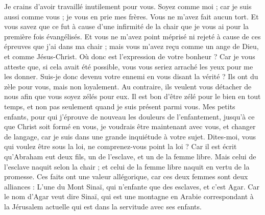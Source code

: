 \begin{multicols}{2}
Je crains d’avoir travaillé inutilement pour vous.
Soyez comme moi ; car je suis aussi comme vous ; je vous en prie mes frères.
Vous ne m'avez fait aucun tort. Et vous savez que ce fut à cause d’une infirmité de la chair que je vous ai pour la première fois évangélisés.
Et vous ne m’avez point méprisé ni rejeté à cause de ces épreuves que j’ai dans ma chair ; mais vous m'avez reçu comme un ange de Dieu, et comme Jésus-Christ.
Où donc est l’expression de votre bonheur ? Car je vous atteste que, si cela avait été possible, vous vous seriez arraché les yeux pour me les donner.
Suis-je donc devenu votre ennemi en vous disant la vérité ?
Ils ont du zèle pour vous, mais non loyalement. Au contraire, ils veulent vous détacher de nous afin que vous soyez zélés pour eux.
Il est bon d'être zélé pour le bien en tout temps, et non pas seulement quand je suis présent parmi vous.
Mes petits enfants, pour qui j’éprouve de nouveau les douleurs de l’enfantement, jusqu'à ce que Christ soit formé en vous,
je voudrais être maintenant avec vous, et changer de langage, car je suis dans une grande inquiétude à votre sujet.
Dites-moi, vous qui voulez être sous la loi, ne comprenez-vous point la loi ?
Car il est écrit qu'Abraham eut deux fils, un de l’esclave, et un de la femme libre.
Mais celui de l’esclave naquit selon la chair ; et celui de la femme libre naquit en vertu de la promesse.
Ces faits ont une valeur allégorique, car ces deux femmes sont deux alliances : L'une du Mont Sinaï, qui n’enfante que des esclaves, et c'est Agar.
Car le nom d'Agar veut dire Sinaï, qui est une montagne en Arabie correspondant à la Jérusalem actuelle qui est dans la servitude avec ses enfants.

\end{multicols}
